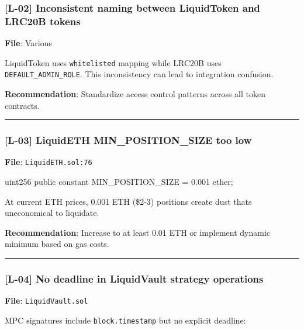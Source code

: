 \documentclass[
]{article}
\newenvironment{Shaded}{}{}
\newcommand{\NormalTok}[1]{#1}
\begin{document}
\subsubsection{{[}L-02{]} Inconsistent naming between LiquidToken and
LRC20B
tokens}\label{l-02-inconsistent-naming-between-liquidtoken-and-lrc20b-tokens}

\textbf{File}: Various

LiquidToken uses \texttt{whitelisted} mapping while LRC20B uses
\texttt{DEFAULT\_ADMIN\_ROLE}. This inconsistency can lead to
integration confusion.

\textbf{Recommendation}: Standardize access control patterns across all
token contracts.

\begin{center}\rule{0.5\linewidth}{0.5pt}\end{center}

\subsubsection{{[}L-03{]} LiquidETH MIN\_POSITION\_SIZE too
low}\label{l-03-liquideth-min_position_size-too-low}

\textbf{File}: \texttt{LiquidETH.sol:76}

\begin{Shaded}
\begin{Highlighting}[]
\NormalTok{uint256 public constant MIN\_POSITION\_SIZE = 0.001 ether;}
\end{Highlighting}
\end{Shaded}

At current ETH prices, 0.001 ETH (\$2-3) positions create dust
that\textquotesingle s uneconomical to liquidate.

\textbf{Recommendation}: Increase to at least 0.01 ETH or implement
dynamic minimum based on gas costs.

\begin{center}\rule{0.5\linewidth}{0.5pt}\end{center}

\subsubsection{{[}L-04{]} No deadline in LiquidVault strategy
operations}\label{l-04-no-deadline-in-liquidvault-strategy-operations}

\textbf{File}: \texttt{LiquidVault.sol}

MPC signatures include \texttt{block.timestamp} but no explicit
deadline:
\end{document}
